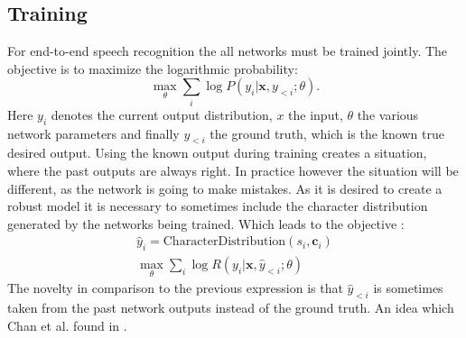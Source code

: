 \subsection{Training}
For end-to-end speech recognition the all networks must be trained jointly. The objective is to maximize the logarithmic probability:
\begin{equation}
\max\limits_\theta \sum\limits_{i} \log P(y_i | \mathbf{x}, y_{<i};\theta).
\end{equation}
Here $y_i$ denotes the current output distribution, $x$ the input, $\theta$ the various network parameters and finally $y_{<i}$ the ground truth, which is the known true desired output.
Using the known output during training creates a situation, where the past outputs are always right. In practice however the situation will be different, as the network is going to make mistakes. As it is desired to create a robust model it is necessary to sometimes include the character distribution generated by the networks being trained.
Which leads to the objective \cite[page 5]{Chan2015}:
\begin{align}
\hat{y}_{i} = \text{CharacterDistribution}(s_i,\textbf{c}_i) \\
\max_{\theta} \sum\limits_{i} \log R(y_i|\mathbf{x},\hat{y}_{<i};\theta)
\end{align}
The novelty in comparison to the previous expression is that $\hat{y}_{<i}$ is sometimes taken from the past network outputs instead of the ground truth. An idea which Chan et al. found in \cite{Bengio2015}.
